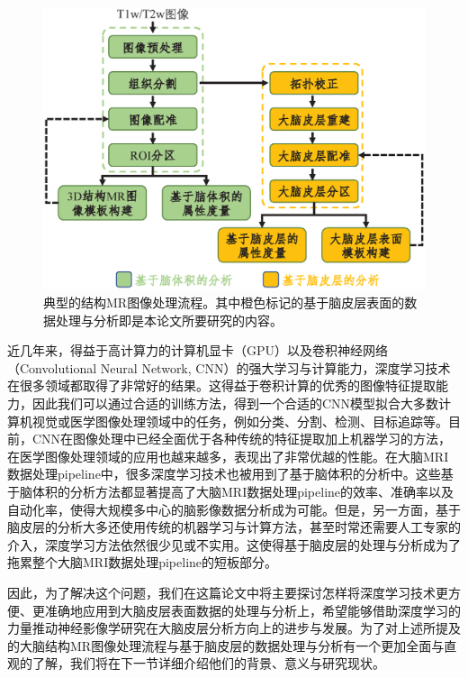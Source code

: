 \begin{figure}[t]
    \centering
    \includegraphics[width=.8\linewidth]{figure/flowchart_of_MRI_process_pipeline.eps}
    \caption{\label{fig:flowchart_of_MRI_process_pipeline}典型的结构MR图像处理流程。其中橙色标记的基于脑皮层表面的数据处理与分析即是本论文所要研究的内容。}
\end{figure}

近几年来，得益于高计算力的计算机显卡（GPU）以及卷积神经网络（Convolutional Neural Network, CNN）的强大学习与计算能力，深度学习技术\cite{goodfellow2016deep}在很多领域都取得了非常好的结果。这得益于卷积计算的优秀的图像特征提取能力，因此我们可以通过合适的训练方法，得到一个合适的CNN模型拟合大多数计算机视觉或医学图像处理领域中的任务，例如分类、分割、检测、目标追踪等。目前，CNN在图像处理中已经全面优于各种传统的特征提取加上机器学习的方法，在医学图像处理领域的应用也越来越多，表现出了非常优越的性能\cite{shen2017deep,litjens2017survey}。在大脑MRI数据处理pipeline中，很多深度学习技术也被用到了基于脑体积的分析中\cite{li2019computational}。这些基于脑体积的分析方法都显著提高了大脑MRI数据处理pipeline的效率、准确率以及自动化率，使得大规模多中心的脑影像数据分析成为可能。但是，另一方面，基于脑皮层的分析大多还使用传统的机器学习与计算方法，甚至时常还需要人工专家的介入，深度学习方法依然很少见或不实用。这使得基于脑皮层的处理与分析成为了拖累整个大脑MRI数据处理pipeline的短板部分。

因此，为了解决这个问题，我们在这篇论文中将主要探讨怎样将深度学习技术更方便、更准确地应用到大脑皮层表面数据的处理与分析上，希望能够借助深度学习的力量推动神经影像学研究在大脑皮层分析方向上的进步与发展。为了对上述所提及的大脑结构MR图像处理流程与基于脑皮层的数据处理与分析有一个更加全面与直观的了解，我们将在下一节详细介绍他们的背景、意义与研究现状。


